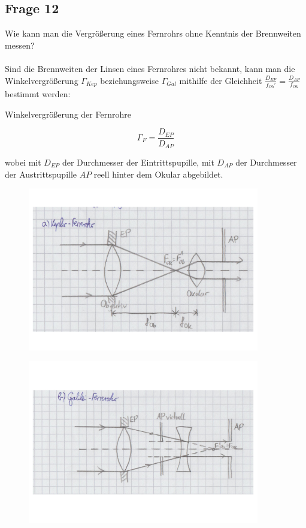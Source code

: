 \documentclass[a4paper,10pt]{scrartcl}
\begin{document}
	\subsection{Frage 12}
		Wie kann man die Vergrößerung eines Fernrohrs ohne Kenntnis der Brennweiten messen?
		\\
		\\
		Sind die Brennweiten der Linsen eines Fernrohres nicht bekannt, kann man die Winkelvergrößerung $\Gamma_{Kep}$ beziehungsweise $\Gamma_{Gal}$ mithilfe der Gleichheit $\frac{D_{EP}}{f_{Ob}'}=\frac{D_{AP}}{f_{Ok}}$ bestimmt werden:
	
		Winkelvergrößerung der Fernrohre

			\[\Gamma_F=\frac{D_{EP}}{D_{AP}}\]
	
		wobei mit $D_{EP}$ der Durchmesser der Eintrittspupille, mit $D_{AP}$ der Durchmesser der Austrittspupille $AP$ reell hinter dem Okular abgebildet.
		
				\begin{figure}[h]
\centering
\includegraphics[width=0.9\textwidth]{./Bilder/og10}
\end{figure}
\FloatBarrier
	\begin{figure}[h]
\centering
\includegraphics[width=0.9\textwidth]{./Bilder/og11}
\end{figure}
\FloatBarrier
\end{document}
